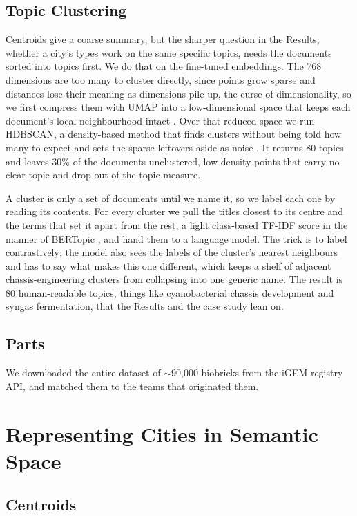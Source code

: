 \documentclass[12pt,a4paper]{article}
\begin{document}
	\subsection{Topic Clustering}
	
	Centroids give a coarse summary, but the sharper question in the Results, whether a city's types work on the same specific topics, needs the documents sorted into topics first. We do that on the fine-tuned embeddings. The 768 dimensions are too many to cluster directly, since points grow sparse and distances lose their meaning as dimensions pile up, the curse of dimensionality, so we first compress them with UMAP into a low-dimensional space that keeps each document's local neighbourhood intact \parencite{mcinnesUMAP2018}. Over that reduced space we run HDBSCAN, a density-based method that finds clusters without being told how many to expect and sets the sparse leftovers aside as noise \parencite{campelloHDBSCAN2013}. It returns 80 topics and leaves 30\% of the documents unclustered, low-density points that carry no clear topic and drop out of the topic measure.
	
	A cluster is only a set of documents until we name it, so we label each one by reading its contents. For every cluster we pull the titles closest to its centre and the terms that set it apart from the rest, a light class-based TF-IDF score in the manner of BERTopic \parencite{grootendorstBERTopic2022}, and hand them to a language model. The trick is to label contrastively: the model also sees the labels of the cluster's nearest neighbours and has to say what makes this one different, which keeps a shelf of adjacent chassis-engineering clusters from collapsing into one generic name. The result is 80 human-readable topics, things like cyanobacterial chassis development and syngas fermentation, that the Results and the case study lean on.
	
	\subsection{Parts}
	
	We downloaded the entire dataset of $\sim$90,000 biobricks from the iGEM registry API, and matched them to the teams that originated them.
	
	\section{Representing Cities in Semantic Space}
	
	
	\subsection{Centroids}
	
\end{document}
